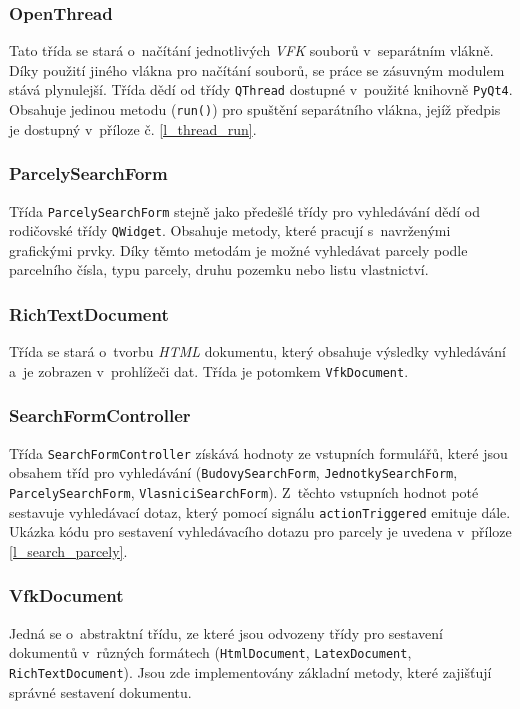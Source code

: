 \documentclass[a4paper,12pt,oneside]{book}
\begin{document}
\subsubsection{OpenThread}
Tato třída se stará o~načítání jednotlivých \textit{VFK} souborů
v~separátním vlákně. Díky použití jiného vlákna pro načítání souborů,
se práce se zásuvným modulem stává plynulejší. Třída dědí od třídy
\texttt{QThread} dostupné v~použité knihovně \texttt{PyQt4}. Obsahuje
jedinou metodu (\texttt{run()}) pro spuštění separátního vlákna,
jejíž předpis je dostupný v~příloze č. \ref{l_thread_run}.

\subsubsection{ParcelySearchForm}
Třída \texttt{ParcelySearchForm} stejně jako předešlé třídy pro
vyhledávání dědí od rodičovské třídy \texttt{QWidget}. Obsahuje
metody, které pracují s~navrženými grafickými prvky. Díky těmto
metodám je možné vyhledávat parcely podle parcelního čísla, typu
parcely, druhu pozemku nebo listu vlastnictví.

\subsubsection{RichTextDocument}
Třída se stará o~tvorbu \textit{HTML} dokumentu, který obsahuje
výsledky vyhledávání a~je zobrazen v~prohlížeči dat. Třída je potomkem
\texttt{VfkDocument}.

\subsubsection{SearchFormController}
Třída \texttt{SearchFormController} získává hodnoty ze vstupních
formulářů, které jsou obsahem tříd pro vyhledávání
(\texttt{BudovySearchForm}, \texttt{JednotkySearchForm},
\texttt{Par\-celySearchForm}, \texttt{VlasniciSearchForm}). Z~těchto
vstupních hodnot poté sestavuje vyhledávací dotaz, který pomocí
signálu \texttt{actionTriggered} emituje dále. Ukázka kódu pro
sestavení vyhledávacího dotazu pro parcely je uvedena v~příloze
\ref{l_search_parcely}.

\subsubsection{VfkDocument}
\label{l_vfkDocument}
Jedná se o~abstraktní třídu, ze které jsou odvozeny třídy pro
sestavení dokumentů v~různých formátech (\texttt{HtmlDocument},
\texttt{LatexDocument}, \texttt{RichTextDocument}). Jsou zde
implementovány základní metody, které zajišťují správné sestavení
dokumentu.
\end{document}
